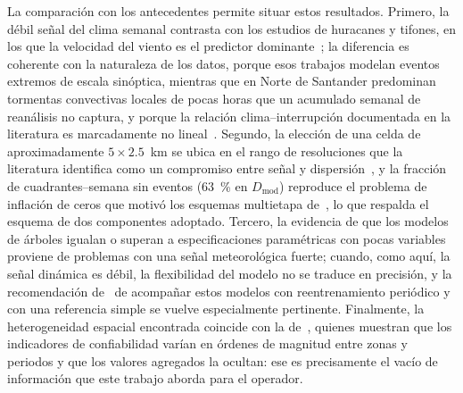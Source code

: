 La comparación con los antecedentes permite situar estos resultados. Primero, la débil señal del clima semanal contrasta con los estudios de huracanes y tifones, en los que la velocidad del viento es el predictor dominante~\cite{ref43,ref37}; la diferencia es coherente con la naturaleza de los datos, porque esos trabajos modelan eventos extremos de escala sinóptica, mientras que en Norte de Santander predominan tormentas convectivas locales de pocas horas que un acumulado semanal de reanálisis no captura, y porque la relación clima--interrupción documentada en la literatura es marcadamente no lineal~\cite{ref41}. Segundo, la elección de una celda de aproximadamente $5\times 2{.}5$~km se ubica en el rango de resoluciones que la literatura identifica como un compromiso entre señal y dispersión~\cite{ref68liu,ref41,ref42}, y la fracción de cuadrantes--semana sin eventos ($63$~\% en $D_{\mathrm{mod}}$) reproduce el problema de inflación de ceros que motivó los esquemas multietapa de~\textcite{ref42}, lo que respalda el esquema de dos componentes adoptado. Tercero, la evidencia de que los modelos de árboles igualan o superan a especificaciones paramétricas con pocas variables~\cite{ref37} proviene de problemas con una señal meteorológica fuerte; cuando, como aquí, la señal dinámica es débil, la flexibilidad del modelo no se traduce en precisión, y la recomendación de~\textcite{ref43} de acompañar estos modelos con reentrenamiento periódico y con una referencia simple se vuelve especialmente pertinente. Finalmente, la heterogeneidad espacial encontrada coincide con la de~\textcite{ref8}, quienes muestran que los indicadores de confiabilidad varían en órdenes de magnitud entre zonas y periodos y que los valores agregados la ocultan: ese es precisamente el vacío de información que este trabajo aborda para el operador.

